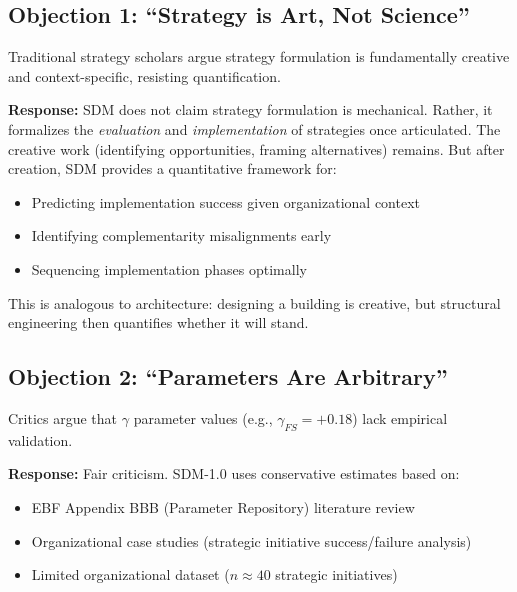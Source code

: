 \subsection{Objection 1: ``Strategy is Art, Not Science''}

\begin{tcolorbox}[colback=red!5!white, colframe=red!50!black,
    title=Objection: Strategy Cannot Be Formalized]
Traditional strategy scholars argue strategy formulation is fundamentally creative and context-specific, resisting quantification.
\end{tcolorbox}

\textbf{Response:} SDM does not claim strategy formulation is mechanical. Rather, it formalizes the \textit{evaluation} and \textit{implementation} of strategies once articulated. The creative work (identifying opportunities, framing alternatives) remains. But after creation, SDM provides a quantitative framework for:
\begin{itemize}
    \item Predicting implementation success given organizational context
    \item Identifying complementarity misalignments early
    \item Sequencing implementation phases optimally
\end{itemize}

This is analogous to architecture: designing a building is creative, but structural engineering then quantifies whether it will stand.

\subsection{Objection 2: ``Parameters Are Arbitrary''}

\begin{tcolorbox}[colback=red!5!white, colframe=red!50!black,
    title=Objection: Complementarity Values ($\gamma$) Are Ad-hoc]
Critics argue that $\gamma$ parameter values (e.g., $\gamma_{FS} = +0.18$) lack empirical validation.
\end{tcolorbox}

\textbf{Response:} Fair criticism. SDM-1.0 uses conservative estimates based on:
\begin{itemize}
    \item EBF Appendix BBB (Parameter Repository) literature review
    \item Organizational case studies (strategic initiative success/failure analysis)
    \item Limited organizational dataset ($n \approx 40$ strategic initiatives)
\end{itemize}

